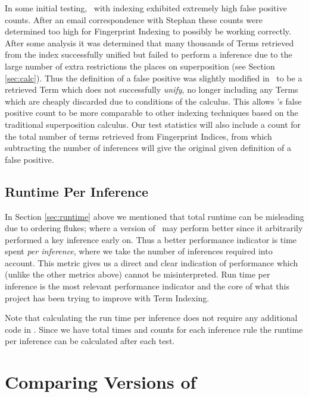 In some initial testing, \beagle\ with indexing exhibited extremely high false positive
counts. After an email correspondence with Stephan  these counts were determined
too high for Fingerprint Indexing to possibly be working correctly. After some analysis
it was determined that many thousands of Terms retrieved from the index successfully unified but failed to
perform a inference due to the large number of extra restrictions the \HSWAC places
on superposition (see Section \ref{sec:calc}). Thus the definition of a false positive
was slightly modified in \beagle\ to be a retrieved Term which does not successfully
\emph{unify}, no longer including any Terms which are cheaply discarded due to conditions
of the calculus. This allows \beagle's false positive count to be more comparable
to other indexing techniques based on the traditional superposition calculus.
Our test statistics will also include a count for the total number of terms retrieved
from Fingerprint Indices, from which subtracting the number of inferences will
give the original given definition of a false positive.

\subsection{Runtime Per Inference}

In Section \ref{sec:runtime} above we mentioned that total runtime can be misleading
due to ordering flukes; where a version of \beagle\ may perform better since it
arbitrarily performed a key inference early on. Thus a better performance indicator
is time spent \emph{per inference}, where we take the number of inferences required into
account. This metric gives us a direct and clear indication of performance which
(unlike the other metrics above) cannot be misinterpreted. Run time per inference
is the most relevant performance indicator and the core of what this project
has been trying to improve with Term Indexing.

Note that calculating the run time per inference does not require any additional code in \beagle. Since we
have total times and counts for each inference rule the runtime per inference can
be calculated after each test.

\section{Comparing Versions of \Beagle}
\label{sec:indexresults}

